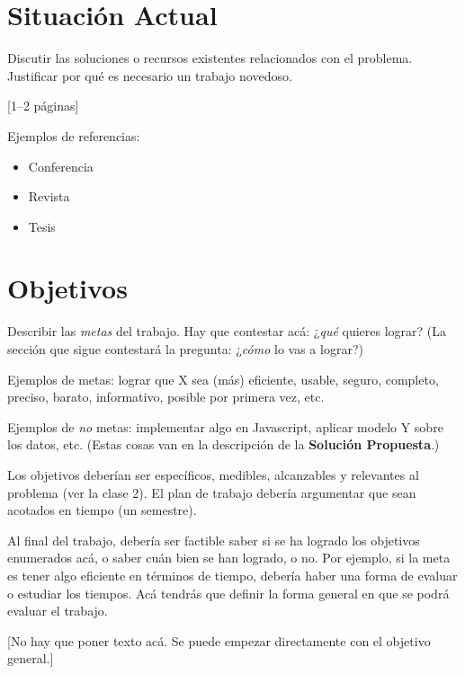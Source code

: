 \documentclass[guia]{upropuesta}
\begin{document}
\section{Situación Actual}\label{sec:sa}

\begin{pauta}
Discutir las soluciones o recursos existentes relacionados con el problema. Justificar por qué es necesario un trabajo novedoso.

[1--2 páginas]
\end{pauta}

Ejemplos de referencias:

\begin{itemize}
\item Conferencia~\cite{CorlessJK97}
\item Revista~\cite{NewmanT42}
\item Tesis~\cite{Turing38}
\end{itemize}


\section{Objetivos}\label{chap:obj}

\begin{pauta}
Describir las \textit{metas} del trabajo. Hay que contestar acá: ¿\textit{qué} quieres lograr? (La sección que sigue contestará la pregunta: ¿\textit{cómo} lo vas a lograr?)

Ejemplos de metas: lograr que X sea (más) eficiente, usable, seguro, completo, preciso, barato, informativo, posible por primera vez, etc.

Ejemplos de \textit{no} metas: implementar algo en Javascript, aplicar modelo Y sobre los datos, etc. (Estas cosas van en la descripción de la \textbf{Solución Propuesta}.)

Los objetivos deberían ser específicos, medibles, alcanzables y relevantes al problema (ver la clase 2). El plan de trabajo debería argumentar que sean acotados en tiempo (un semestre).

Al final del trabajo, debería ser factible saber si se ha logrado los objetivos enumerados acá, o saber cuán bien se han logrado, o no. Por ejemplo, si la meta es tener algo eficiente en términos de tiempo, debería haber una forma de evaluar o estudiar los tiempos. Acá tendrás que definir la forma general en que se podrá evaluar el trabajo.

[No hay que poner texto acá. Se puede empezar directamente con el objetivo general.]
\end{pauta}
\end{document}

